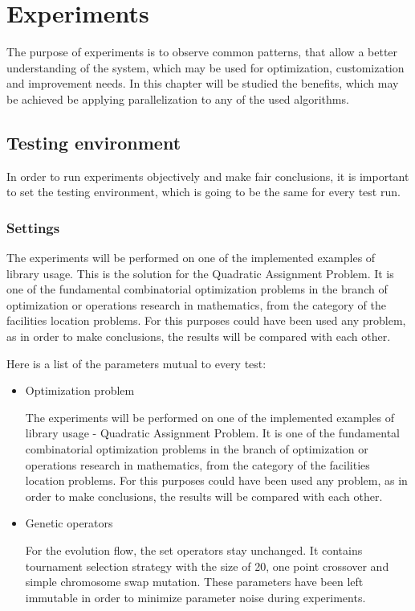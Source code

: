 \chapter{Experiments}

The purpose of experiments is to observe common patterns, that allow a better understanding of the system, which may be used for optimization, customization and improvement needs. In this chapter will be studied the benefits, which may be achieved be applying parallelization to any of the used algorithms.

\section{Testing environment}

In order to run experiments objectively and make fair conclusions, it is important to set the testing environment, which is going to be the same for every test run.

\subsection{Settings}

The experiments will be performed on one of the implemented examples of library usage. This is the solution for the Quadratic Assignment Problem. It is one of the fundamental combinatorial optimization problems in the branch of optimization or operations research in mathematics, from the category of the facilities location problems. For this purposes could have been used any problem, as in order to make conclusions, the results will be compared with each other.

Here is a list of the parameters mutual to every test:
\begin{itemize}

\item Optimization problem

The experiments will be performed on one of the implemented examples of library usage -  Quadratic Assignment Problem. It is one of the fundamental combinatorial optimization problems in the branch of optimization or operations research in mathematics, from the category of the facilities location problems. For this purposes could have been used any problem, as in order to make conclusions, the results will be compared with each other.


\item Genetic operators

For the evolution flow, the set operators stay unchanged. It contains tournament selection strategy with the size of 20, one point crossover and simple chromosome swap mutation. These parameters have been left immutable in order to minimize parameter noise during experiments.

\end{itemize}

